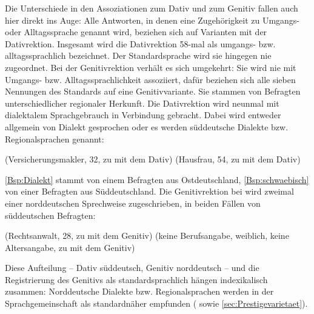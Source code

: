 Die Unterschiede in den Assoziationen zum Dativ und zum Genitiv fallen auch hier direkt ins Auge: 
Alle Antworten, in denen eine Zugehörigkeit zu Umgangs- oder Alltagssprache genannt wird, beziehen sich auf Varianten mit der Dativrektion. 
Insgesamt wird die Dativrektion 58-mal als umgangs- bzw. alltagssprachlich bezeichnet. 
Der Standardsprache wird sie hingegen nie zugeordnet. 
Bei der Genitivrektion verhält es sich umgekehrt: 
Sie wird nie mit Umgangs- bzw. Alltagssprachlichkeit assoziiert, dafür beziehen sich alle sieben Nennungen des Standards auf eine Genitivvariante. 
Sie stammen von Befragten unterschiedlicher regionaler Herkunft. 
Die Dativrektion wird neunmal mit dialektalem Sprachgebrauch in Verbindung gebracht. Dabei wird entweder allgemein von \glqq Dialekt\grqq{} gesprochen oder es werden süddeutsche Dialekte bzw. Regionalsprachen genannt: 
\begin{exe}
\ex {} \label{Bsp:Dialekt} (Versicherungsmakler, 32, zu \wegen{} mit dem Dativ)
\ex {} (Hausfrau, 54, zu \gegenueber{} mit dem Dativ) \label{Bsp:schwaebisch}
\end{exe}
\autoref{Bsp:Dialekt} stammt von einem Befragten aus Ostdeutschland, \autoref{Bsp:schwaebisch} von einer Befragten aus Süddeutschland. 
Die Genitivrektion bei \wegen{} wird zweimal einer norddeutschen Sprechweise zugeschrieben, in beiden Fällen von süddeutschen Befragten: 
\begin{exe}
\ex {} (Rechtsanwalt, 28, zu \wegen{} mit dem Genitiv)
\ex {} (keine Berufsangabe, weiblich, keine Altersangabe, zu \wegen{} mit dem Genitiv)
\end{exe}
Diese Aufteilung -- Dativ süddeutsch, Genitiv norddeutsch -- und die Registrierung des Genitivs als standardsprachlich hängen indexikalisch zusammen: 
Norddeutsche Dialekte bzw. Regionalsprachen werden in der Sprachgemeinschaft als standardnäher empfunden (\citealp[s.][76--77]{Hundt.1992} sowie \autoref{sec:Prestigevarietaet}). 

